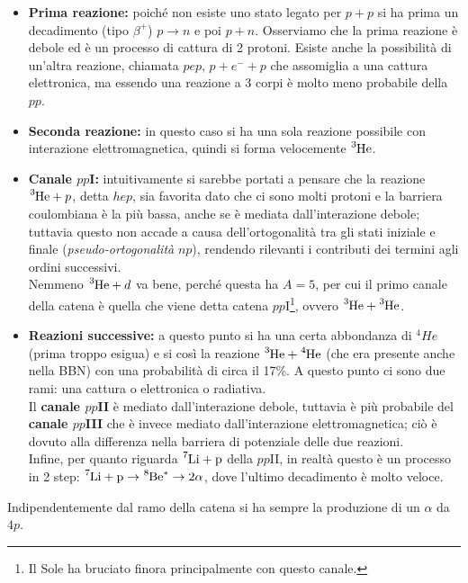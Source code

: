 \begin{itemize}
    \item \textbf{Prima reazione:} poiché non esiste uno stato legato per $p+p$ si ha prima un decadimento (tipo $\beta^+$) $p\to n$ e poi $p+n$. Osserviamo che la prima reazione è debole ed è un processo di cattura di 2 protoni. Esiste anche la possibilità di un'altra reazione, chiamata $pep$, $p+e^-+p$ che assomiglia a una cattura elettronica, ma essendo una reazione a 3 corpi è molto meno probabile della $pp$.
    \item \textbf{Seconda reazione:} in questo caso si ha una sola reazione possibile con interazione elettromagnetica, quindi si forma velocemente $\ce{^3He}$.
    \item \textbf{Canale $pp$I:} intuitivamente si sarebbe portati a pensare che la reazione $\ce{^3He} + p$, detta $hep$, sia favorita dato che ci sono molti protoni e la barriera coulombiana è la più bassa, anche se è mediata dall'interazione debole; tuttavia questo non accade a causa dell'ortogonalità tra gli stati iniziale e finale (\textit{pseudo-ortogonalità} $np$), rendendo rilevanti i contributi dei termini agli ordini successivi.\\
    Nemmeno $\ce{^3He}+d$ va bene, perché questa ha $A=5$, per cui il primo canale della catena è quella che viene detta catena $pp$I\footnote{Il Sole ha bruciato finora principalmente con questo canale.}, ovvero $\ce{^3He}+\ce{^3He}$.
    \item \textbf{Reazioni successive:} a questo punto si ha una certa abbondanza di $^4He$ (prima troppo esigua) e si  così la reazione $\ce{^3He}+\ce{^4He}$ (che era presente anche nella BBN) con una probabilità di circa il 17\%. A questo punto ci sono due rami: una cattura o elettronica o radiativa.\\ 
    Il \textbf{canale $pp$II} è mediato dall'interazione debole, tuttavia è più probabile del \textbf{canale $pp$III} che è invece mediato dall'interazione elettromagnetica; ciò è dovuto alla differenza nella barriera di potenziale delle due reazioni.\\
    Infine, per quanto riguarda $\ce{^7Li + p}$ della $pp$II, in realtà questo è un processo in 2 step: $\ce{^7Li + p}\to\ce{^8Be}^*\to2\alpha$, dove l'ultimo decadimento è molto veloce.
\end{itemize} 
Indipendentemente dal ramo della catena si ha sempre la produzione di un $\alpha$ da $4p$.

